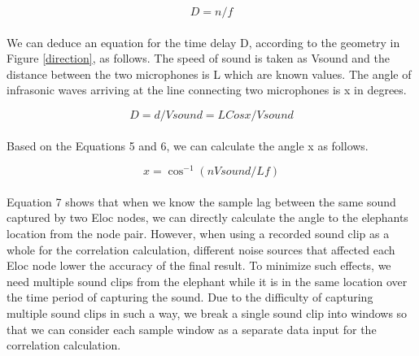 \documentclass[12pt]{article}
\numberwithin{figure}{section}
\numberwithin{table}{section}
\begin{document}
\begin{equation}
D=n/f
\end{equation}

\paragraph{}
We can deduce an equation for the time delay D, according to the geometry in Figure \ref{direction}, as follows. The speed of
sound is taken as Vsound and the distance between the two microphones is L which are known values. The angle of infrasonic
waves arriving at the line connecting two microphones is x in degrees.

\begin{equation}
D = d/ Vsound = L Cos x/ Vsound
\end{equation}

\paragraph{}
Based on the Equations 5 and 6, we can calculate the angle x as follows.

\begin{equation}
x=\cos ^{ - 1} (nVsound/Lf)
\end{equation}

\paragraph{}
Equation 7 shows that when we know the sample lag between
the same sound captured by two Eloc nodes, we can
directly calculate the angle to the elephants location from the
node pair. However, when using a recorded sound clip as a
whole for the correlation calculation, different noise sources
that affected each Eloc node lower the accuracy of the final
result. To minimize such effects, we need multiple sound
clips from the elephant while it is in the same location over
the time period of capturing the sound. Due to the difficulty
of capturing multiple sound clips in such a way, we break a
single sound clip into windows so that we can consider each sample window as a separate data input for the correlation
calculation.
\end{document}
